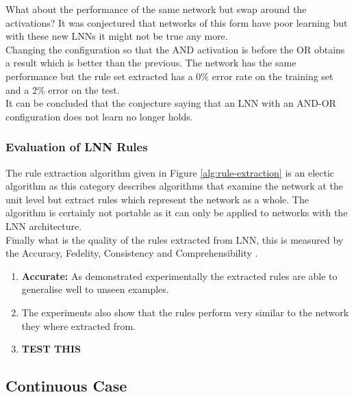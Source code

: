 What about the performance of the same network but swap around the activations? It was conjectured that networks of this form have poor learning \cite{LearningLogicalActivations} but with these new LNNs it might not be true any more.\\

Changing the configuration so that the AND activation is before the OR obtains a result which is better than the previous. The network has the same performance but the rule set extracted has a $0\%$ error rate on the training set and a $2\%$ error on the test.\\

It can be concluded that the conjecture saying that an LNN with an AND-OR configuration does not learn no longer holds.

\subsubsection{Evaluation of LNN Rules}


The rule extraction algorithm given in Figure \ref{alg:rule-extraction} is an electic algorithm as this category describes algorithms that examine the network at the unit level but extract rules which represent the network as a whole. The algorithm is certainly not portable as it can only be applied to networks with the LNN architecture.\\

Finally what is the quality of the rules extracted from LNN, this is measured by the Accuracy, Fedelity, Consistency and Comprehensibility \cite{andrews1995survey}.

\begin{enumerate}
	\item \textbf{Accurate:} As demonstrated experimentally the extracted rules are able to generalise well to unseen examples.
	\item {} The experiments also show that the rules perform very similar to the network they where extracted from.
	\item {} \textbf{TEST THIS}
\end{enumerate}

\subsection{Continuous Case}

